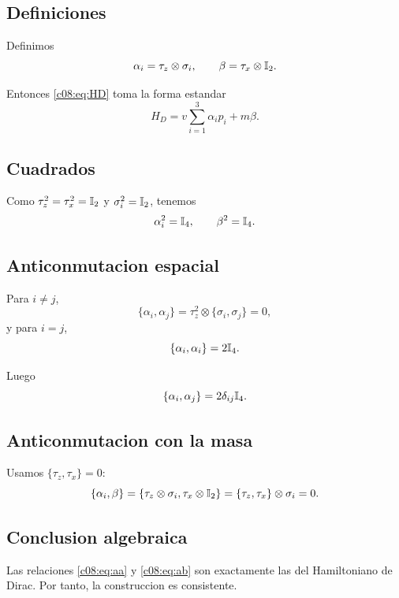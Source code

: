 \subsection{Definiciones}
Definimos
\begin{equation}
\alpha_i = \tau_z\otimes \sigma_i,
\qquad
\beta = \tau_x\otimes \mathbb{I}_2.
\label{c08:eq:alphabeta}
\end{equation}

Entonces \eqref{c08:eq:HD} toma la forma estandar
\begin{equation}
H_D = v\sum_{i=1}^3 \alpha_i p_i + m\beta.
\label{c08:eq:HDstandard}
\end{equation}

\subsection{Cuadrados}
Como \(\tau_z^2=\tau_x^2=\mathbb{I}_2\) y \(\sigma_i^2=\mathbb{I}_2\), tenemos
\begin{equation}
\alpha_i^2=\mathbb{I}_4,
\qquad
\beta^2=\mathbb{I}_4.
\end{equation}

\subsection{Anticonmutacion espacial}
Para \(i\neq j\),
\begin{equation}
\{\alpha_i,\alpha_j\}
=
\tau_z^2\otimes\{\sigma_i,\sigma_j\}
=0,
\end{equation}
y para \(i=j\),
\begin{equation}
\{\alpha_i,\alpha_i\}=2\mathbb{I}_4.
\end{equation}

Luego
\begin{equation}
\{\alpha_i,\alpha_j\}=2\delta_{ij}\mathbb{I}_4.
\label{c08:eq:aa}
\end{equation}

\subsection{Anticonmutacion con la masa}
Usamos \(\{\tau_z,\tau_x\}=0\):
\begin{equation}
\{\alpha_i,\beta\}
=
\{\tau_z\otimes\sigma_i,\tau_x\otimes\mathbb{I}_2\}
=
\{\tau_z,\tau_x\}\otimes \sigma_i
=0.
\label{c08:eq:ab}
\end{equation}

\subsection{Conclusion algebraica}
Las relaciones \eqref{c08:eq:aa} y \eqref{c08:eq:ab} son exactamente las del Hamiltoniano de Dirac. Por tanto, la construccion es consistente.

